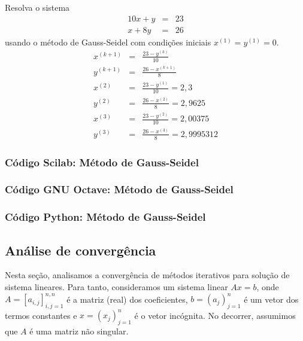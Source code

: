 \begin{ex}
Resolva o sistema
\begin{eqnarray}
  10x+y&=&23\\
  x+8y&=&26
\end{eqnarray}
usando o método de Gauss-Seidel com condições iniciais $x^{(1)}=y^{(1)}=0$.
\begin{eqnarray}
x^{(k+1)}&=&\frac{23-y^{(k)}}{10}\\
y^{(k+1)}&=&\frac{26-x^{(k+1)}}{8}\\
x^{(2)}&=&\frac{23-y^{(1)}}{10}=2,3\\
y^{(2)}&=&\frac{26-x^{(2)}}{8}=2,9625\\
x^{(3)}&=&\frac{23-y^{(2)}}{10}=2,00375  \\
y^{(3)}&=&\frac{26-x^{(3)}}{8}=2,9995312
\end{eqnarray}
\end{ex}

\ifisscilab
\subsubsection{Código Scilab: Método de Gauss-Seidel}


\fi
\ifisoctave
\subsubsection{Código GNU Octave: Método de Gauss-Seidel}


\fi
\ifispython
\subsubsection{Código Python: Método de Gauss-Seidel}


\fi

\subsection{Análise de convergência}

Nesta seção, analisamos a convergência de métodos iterativos para solução de sistema lineares. Para tanto, consideramos um sistema linear $Ax = b$, onde $A = [a_{i,j}]_{i,j=1}^{n,n}$ é a matriz (real) dos coeficientes, $b = (a_j)_{j=1}^n$ é um vetor dos termos constantes e $x = (x_j)_{j=1}^n$ é o vetor incógnita. No decorrer, assumimos que $A$ é uma matriz não singular.

